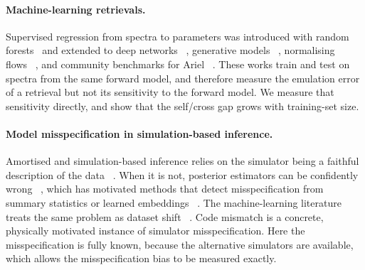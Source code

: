 \paragraph{Machine-learning retrievals.}
Supervised regression from spectra to parameters was introduced with random forests~\cite{TODO_marquez_neila_2018_hela} and extended to deep networks~\cite{TODO_cobb_2019_plannet,TODO_yip_2021_interpretable_dl_retrieval}%
, generative models~\cite{TODO_zingales_waldmann_2018_exogan}%
, normalising flows~\cite{TODO_ardevol_martinez_2022_flows,TODO_vasist_2023_npe}%
, and community benchmarks for Ariel~\cite{TODO_ariel_data_challenge}%
.
These works train and test on spectra from the same forward model, and therefore measure the emulation error of a retrieval but not its sensitivity to the forward model.
We measure that sensitivity directly, and show that the self/cross gap grows with training-set size.

\paragraph{Model misspecification in simulation-based inference.}
Amortised and simulation-based inference relies on the simulator being a faithful description of the data~\cite{TODO_cranmer_2020_sbi_frontier}%
.
When it is not, posterior estimators can be confidently wrong~\cite{TODO_hermans_2022_sbi_trust_crisis}%
, which has motivated methods that detect misspecification from summary statistics or learned embeddings~\cite{TODO_schmitt_2023_misspecification_detection}%
.
The machine-learning literature treats the same problem as dataset shift~\cite{TODO_quinonero_candela_2009_dataset_shift,TODO_ben_david_2010_domain_adaptation}%
.
Code mismatch is a concrete, physically motivated instance of simulator misspecification.
Here the misspecification is fully known, because the alternative simulators are available, which allows the misspecification bias to be measured exactly.

